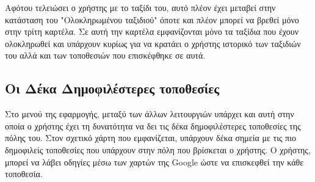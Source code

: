 \documentclass[oneside, 12pt]{book}
\begin{document}
Αφότου τελειώσει ο χρήστης με το ταξίδι του, αυτό πλέον έχει μεταβεί 
στην κατάσταση του "Ολοκληρωμένου ταξιδιού" όποτε και πλέον μπορεί να 
βρεθεί μόνο στην τρίτη καρτέλα.
Σε αυτή την καρτέλα εμφανίζονται μόνο τα ταξίδια που έχουν ολοκληρωθεί 
και υπάρχουν κυρίως για να κρατάει ο χρήστης ιστορικό των ταξιδιών του 
αλλά και των τοποθεσιών που επισκέφθηκε σε αυτά.

\subsection{Οι Δέκα Δημοφιλέστερες τοποθεσίες}
Στο μενού της εφαρμογής, μεταξύ των άλλων λειτουργιών υπάρχει και αυτή 
στην οποία ο χρήστης έχει τη δυνατότητα να δει τις δέκα 
δημοφιλέστερες τοποθεσίες της πόλης του. Στον σχετικό χάρτη που εμφανίζεται, υπάρχουν δέκα σημεία με τις πιο δημοφιλείς τοποθεσίες που υπάρχουν 
στην πόλη που βρίσκεται ο χρήστης. Ο χρήστης, μπορεί να λάβει οδηγίες 
μέσω των χαρτών της Google ώστε να επισκεφθεί την κάθε τοποθεσία.
\end{document}
